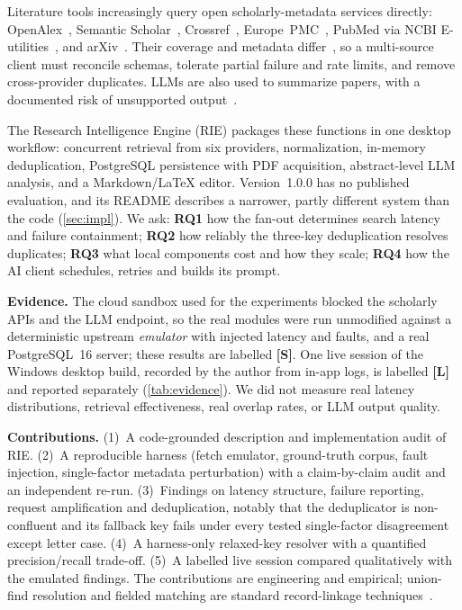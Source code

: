 \documentclass[conference]{IEEEtran}
\newcommand{\RIE}{RIE}
\begin{document}
Literature tools increasingly query open scholarly-metadata services directly: OpenAlex~\cite{priem2022openalex}, Semantic Scholar~\cite{lo2020s2orc,kinney2023semantic}, Crossref~\cite{hendricks2020crossref}, Europe~PMC~\cite{ferguson2021europepmc}, PubMed via NCBI E-utilities~\cite{sayers2022eutilities}, and arXiv~\cite{arxivapi}. Their coverage and metadata differ~\cite{visser2021large,gusenbauer2020which,alperin2024analysis}, so a multi-source client must reconcile schemas, tolerate partial failure and rate limits, and remove cross-provider duplicates. LLMs are also used to summarize papers, with a documented risk of unsupported output~\cite{ji2023survey,tang2025llmreview}.

The Research Intelligence Engine (\RIE) packages these functions in one desktop workflow: concurrent retrieval from six providers, normalization, in-memory deduplication, PostgreSQL persistence with PDF acquisition, abstract-level LLM analysis, and a Markdown/\LaTeX{} editor. Version~1.0.0 has no published evaluation, and its README describes a narrower, partly different system than the code (\cref{sec:impl}). We ask:
\textbf{RQ1} how the fan-out determines search latency and failure containment;
\textbf{RQ2} how reliably the three-key deduplication resolves duplicates;
\textbf{RQ3} what local components cost and how they scale;
\textbf{RQ4} how the AI client schedules, retries and builds its prompt.

\textbf{Evidence.} The cloud sandbox used for the experiments blocked the scholarly APIs and the LLM endpoint, so the real modules were run unmodified against a deterministic upstream \emph{emulator} with injected latency and faults, and a real PostgreSQL~16 server; these results are labelled \textbf{[S]}. One live session of the Windows desktop build, recorded by the author from in-app logs, is labelled \textbf{[L]} and reported separately (\cref{tab:evidence}). We did not measure real latency distributions, retrieval effectiveness, real overlap rates, or LLM output quality.

\textbf{Contributions.} (1)~A code-grounded description and implementation audit of \RIE. (2)~A reproducible harness (fetch emulator, ground-truth corpus, fault injection, single-factor metadata perturbation) with a claim-by-claim audit and an independent re-run. (3)~Findings on latency structure, failure reporting, request amplification and deduplication, notably that the deduplicator is non-confluent and its fallback key fails under every tested single-factor disagreement except letter case. (4)~A harness-only relaxed-key resolver with a quantified precision/recall trade-off. (5)~A labelled live session compared qualitatively with the emulated findings. The contributions are engineering and empirical; union-find resolution and fielded matching are standard record-linkage techniques~\cite{fellegi1969theory,elmagarmid2007duplicate,christen2012data}.
\end{document}

